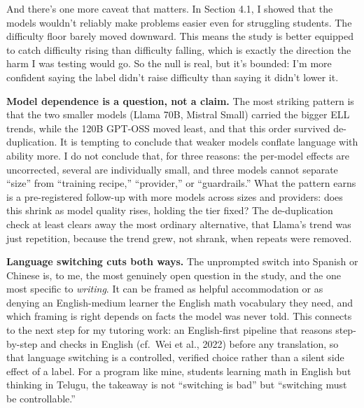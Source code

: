 \documentclass[
]{article}
\begin{document}
And there's one more caveat that matters. In Section 4.1, I showed that
the models wouldn't reliably make problems easier even for struggling
students. The difficulty floor barely moved downward. This means the
study is better equipped to catch difficulty rising than difficulty
falling, which is exactly the direction the harm I was testing would go.
So the null is real, but it's bounded: I'm more confident saying the
label didn't raise difficulty than saying it didn't lower it.

\textbf{Model dependence is a question, not a claim.} The most striking
pattern is that the two smaller models (Llama 70B, Mistral Small)
carried the bigger ELL trends, while the 120B GPT-OSS moved least, and
that this order survived de-duplication. It is tempting to conclude that
weaker models conflate language with ability more. I do not conclude
that, for three reasons: the per-model effects are uncorrected, several
are individually small, and three models cannot separate ``size'' from
``training recipe,'' ``provider,'' or ``guardrails.'' What the pattern
earns is a pre-registered follow-up with more models across sizes and
providers: does this shrink as model quality rises, holding the tier
fixed? The de-duplication check at least clears away the most ordinary
alternative, that Llama's trend was just repetition, because the trend
grew, not shrank, when repeats were removed.

\textbf{Language switching cuts both ways.} The unprompted switch into
Spanish or Chinese is, to me, the most genuinely open question in the
study, and the one most specific to \emph{writing}. It can be framed as
helpful accommodation or as denying an English-medium learner the
English math vocabulary they need, and which framing is right depends on
facts the model was never told. This connects to the next step for my
tutoring work: an English-first pipeline that reasons step-by-step and
checks in English (cf.~Wei et al., 2022) before any translation, so that
language switching is a controlled, verified choice rather than a silent
side effect of a label. For a program like mine, students learning math
in English but thinking in Telugu, the takeaway is not ``switching is
bad'' but ``switching must be controllable.''
\end{document}
